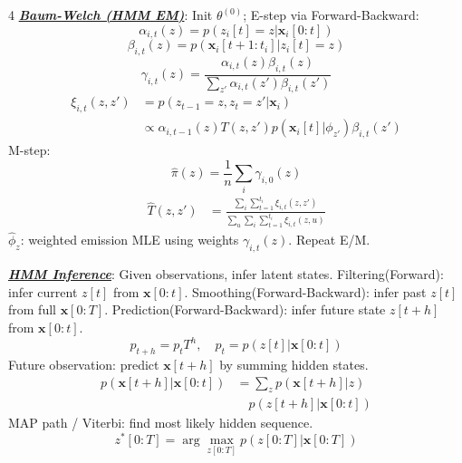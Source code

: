 \documentclass[12pt]{article}
\newcommand{\bulletPoint}[1]{\ul{\textit{\textbf{#1}}}}
\begin{document}
\begin{multicols*}{4}
\bulletPoint{Baum-Welch (HMM EM)}:
Init $\theta^{(0)}$; E-step via Forward-Backward:
\useshortskip \begin{equation*}
    \alpha_{i,t}(z)=p(z_i[t]=z|\mathbf{x}_i[0:t])
\end{equation*}
\useshortskip \begin{equation*}
    \scriptstyle \beta_{i,t}(z)=p(\mathbf{x}_i[t+1:t_i]|z_i[t]=z)
\end{equation*}
\useshortskip \begin{equation*}
    \scriptstyle \gamma_{i,t}(z)=
    \frac{\alpha_{i,t}(z)\beta_{i,t}(z)}
    {\sum_{z'}\alpha_{i,t}(z')\beta_{i,t}(z')}
\end{equation*}
\useshortskip \begin{equation*}
    \begin{split}
        \scriptstyle \xi_{i,t}(z,z')
        &\scriptstyle =p(z_{t-1}=z,z_t=z'|\mathbf{x}_i)\\
        &\scriptstyle \propto \alpha_{i,t-1}(z)T(z,z')
        p(\mathbf{x}_i[t]|\phi_{z'})\beta_{i,t}(z')
    \end{split}
\end{equation*}
M-step:
\useshortskip \begin{equation*}
    \hat{\pi}(z)=\frac{1}{n}\sum_i\gamma_{i,0}(z)
\end{equation*}
\useshortskip \begin{equation*}
    \begin{split}
        \scriptstyle \hat{T}(z,z')
        &\scriptstyle =
        \frac{\sum_i\sum_{t=1}^{t_i}\xi_{i,t}(z,z')}
        {\sum_u\sum_i\sum_{t=1}^{t_i}\xi_{i,t}(z,u)}
    \end{split}
\end{equation*}
$\hat{\phi}_z$: weighted emission MLE using weights $\gamma_{i,t}(z)$. Repeat E/M.

\bulletPoint{HMM Inference}:
Given observations, infer latent states.
Filtering(Forward): infer current $z[t]$ from $\mathbf{x}[0:t]$.
Smoothing(Forward-Backward): infer past $z[t]$ from full $\mathbf{x}[0:T]$.
Prediction(Forward-Backward): infer future state $z[t+h]$ from $\mathbf{x}[0:t]$.
\useshortskip \begin{equation*}
    p_{t+h}=p_tT^h,\quad p_t=p(z[t]|\mathbf{x}[0:t])
\end{equation*}
Future observation: predict $\mathbf{x}[t+h]$ by summing hidden states.
\useshortskip \begin{equation*}
    \begin{split}
        \scriptstyle p(\mathbf{x}[t+h]|\mathbf{x}[0:t])
        &\scriptstyle =\sum_z p(\mathbf{x}[t+h]|z)\\
        &\scriptstyle \quad p(z[t+h]|\mathbf{x}[0:t])
    \end{split}
\end{equation*}
MAP path / Viterbi: find most likely hidden sequence.
\useshortskip \begin{equation*}
    z^*[0:T]=\arg\max_{z[0:T]}p(z[0:T]|\mathbf{x}[0:T])
\end{equation*}


\end{multicols*}
\end{document}
